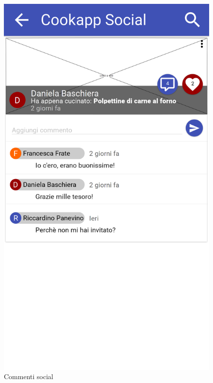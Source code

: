 \begin{figure}[H]
	\begin{minipage}{.49\textwidth}
		\includegraphics[width=\textwidth]{img/wireframe/commenti.png}
		\caption{Commenti social}
	\end{minipage}
	\hfill
	\begin{minipage}{.49\textwidth}

\end{minipage}
\end{figure}
